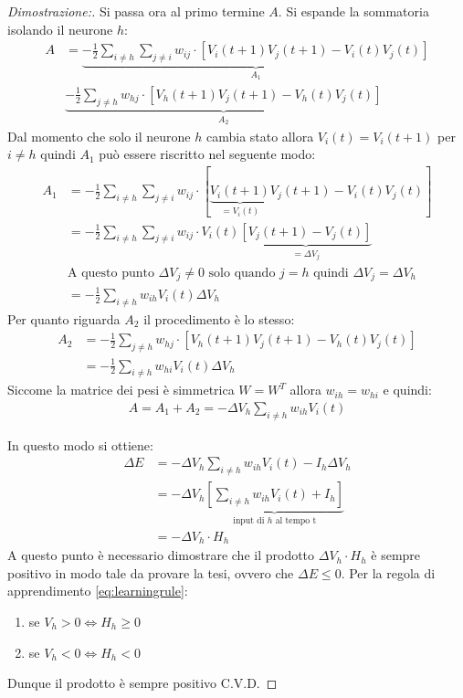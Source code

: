 \begin{proof}[Dimostrazione:]
    Si passa ora al primo termine $A$. Si espande la sommatoria isolando il neurone $h$:
    \begin{align*}
        A &= \underbrace{- \frac{1}{2} \sum_{i \neq h} \sum_{j \neq i} w_{ij} \cdot [V_i(t + 1) V_j(t + 1) - V_i(t) V_j(t)]}_\textrm{$A_1$} \\
        & \underbrace{- \frac{1}{2} \sum_{j \neq h} w_{hj} \cdot [V_h(t + 1) V_j(t + 1) - V_h(t) V_j(t)]}_\textrm{$A_2$}
    \end{align*}
    Dal momento che solo il neurone $h$ cambia stato allora $V_i(t) = V_i(t + 1)$ per $i \neq h$ quindi $A_1$ può essere riscritto nel seguente modo:
    \begin{align*}
        A_1 &= - \frac{1}{2} \sum_{i \neq h} \sum_{j \neq i} w_{ij} \cdot [\underbrace{V_i(t + 1)}_\textrm{$=V_i(t)$} V_j(t + 1) - V_i(t) V_j(t)] \\
        &= - \frac{1}{2} \sum_{i \neq h} \sum_{j \neq i} w_{ij} \cdot V_i(t) \underbrace{[V_j(t + 1) - V_j(t)]}_\textrm{$=\Delta V_j$} \\
        &\text{A questo punto $\Delta V_j \neq 0$ solo quando $j = h$ quindi $\Delta V_j = \Delta V_h$} \\
        &= - \frac{1}{2} \sum_{i \neq h} w_{ih} V_i(t) \Delta V_h
    \end{align*}
    Per quanto riguarda $A_2$ il procedimento è lo stesso:
    \begin{align*}
        A_2 &= - \frac{1}{2} \sum_{j \neq h} w_{hj} \cdot [V_h(t + 1) V_j(t + 1) - V_h(t) V_j(t)] \\
        &= - \frac{1}{2} \sum_{i \neq h} w_{hi} V_i(t) \Delta V_h
    \end{align*}
    Siccome la matrice dei pesi è simmetrica $W = W^T$ allora $w_{ih} = w_{hi}$ e quindi:
    \begin{align*}
        A = A_1 + A_2 = - \Delta V_h \sum_{i \neq h} w_{ih} V_i(t)
    \end{align*}
	
    In questo modo si ottiene:
    \begin{align*}
        \Delta E &= - \Delta V_h \sum_{i \neq h} w_{ih} V_i(t)  - I_h \Delta V_h \\
        &= - \Delta V_h \underbrace{\left[\sum_{i \neq h} w_{ih} V_i(t) + I_h \right]}_\textrm{input di $h$ al tempo t} \\
        &= - \Delta V_h \cdot H_h
    \end{align*}
A questo punto è necessario dimostrare che il prodotto $\Delta V_h \cdot H_h$ è sempre positivo in modo tale da provare la tesi, ovvero che $\Delta E \leq 0$. Per la regola di apprendimento \eqref{eq:learningrule}:
\begin{enumerate}
    \item se $V_h > 0 \Leftrightarrow H_h \geq 0$
    \item se $V_h < 0 \Leftrightarrow H_h < 0$
\end{enumerate}
Dunque il prodotto è sempre positivo C.V.D.
\end{proof}

